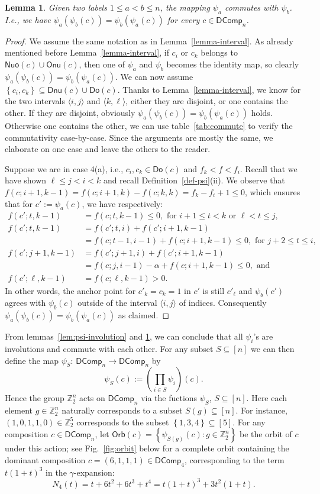 \documentclass[reqno]{amsart}
\numberwithin{equation}{section}
\newtheorem{lemma}[theorem]{Lemma}
\theoremstyle{definition}
\theoremstyle{named}
\newcommand{\set}[1]{\left\{#1\right\}}
\newcommand{\bZ}{\mathbb{Z}}
\def\DComp{\mathsf{DComp}}
\def\Nuo{\mathsf{Nuo}}
\def\Onu{\mathsf{Onu}}
\def\Dnu{\mathsf{Dnu}}
\def\Do{\mathsf{Do}}
\def\uf{\underline{f}}
\def\Orb{\mathsf{Orb}}
\begin{document}
\begin{lemma}\label{lem:commute}
Given two labels $1\le a<b\le n$, the mapping $\psi_a$ commutes with $\psi_b$. I.e., we have $\psi_a(\psi_b(c))=\psi_b(\psi_a(c))$ for every $c\in\DComp_n$.
\end{lemma}
\begin{proof}
We assume the same notation as in Lemma~\ref{lemma-interval}. As already mentioned before Lemma~\ref{lemma-interval}, if $c_i$ or $c_k$ belongs to $\Nuo(c)\cup\Onu(c)$, then one of $\psi_a$ and $\psi_b$ becomes the identity map, so clearly $\psi_a(\psi_b(c))=\psi_b(\psi_a(c))$. We can now assume $\set{c_i,c_k}\subseteq\Dnu(c)\cup\Do(c)$. Thanks to Lemma~\ref{lemma-interval}, we know for the two intervals $\langle i,j\rangle$ and $\langle k,\ell\rangle$, either they are disjoint, or one contains the other. If they are disjoint, obviously $\psi_a(\psi_b(c))=\psi_b(\psi_a(c))$ holds. Otherwise one contains the other, we can use table~\ref{tab:commute} to verify the commutativity case-by-case. Since the arguments are mostly the same, we elaborate on one case and leave the others to the reader. 

Suppose we are in case 4(a), i.e., $c_i,c_k\in\Do(c)$ and $f_k<\uf<f_i$. Recall that we have shown $\ell\le j<i<k$ and recall Definition~\ref{def-psi}(ii). We observe that $f(c;i+1,k-1)=f(c;i+1,k)-f(c;k,k)=f_k-f_i+1\le 0$, which ensures that for $c':=\psi_a(c)$, we have respectively: 
\begin{align*}
f(c';t,k-1) &=f(c;t,k-1)\le 0,\text{ for $i+1\le t<k$ or $\ell<t\le j$,}\\
f(c';t,k-1) &=f(c';t,i)+f(c';i+1,k-1)\\
&=f(c;t-1,i-1)+f(c;i+1,k-1)\le 0, \text{ for $j+2\le t\le i$,}\\
f(c';j+1,k-1) &=f(c';j+1,i)+f(c';i+1,k-1)\\
&=f(c;j,i-1)-\alpha+f(c;i+1,k-1)\le 0, \text{ and}\\
f(c';\ell,k-1) &= f(c;\ell,k-1)>0.
\end{align*}
In other words, the anchor point for $c'_k=c_k=1$ in $c'$ is still $c'_{\ell}$ and $\psi_b(c')$ agrees with $\psi_b(c)$ outside of the interval $\langle i,j\rangle$ of indices. Consequently $\psi_a(\psi_b(c))=\psi_b(\psi_a(c))$ as claimed.
\end{proof}
                        
From lemmas~\ref{lem:psi-involution} and \ref{lem:commute}, we can conclude that all $\psi_i$'s are involutions and commute with each other. For any subset $S\subseteq [n]$ we can then define the map $\psi_S$: $\DComp_n \to \DComp_n$ by
$$ \psi_S(c):=\left(\prod_{i\in S}\psi_i\right)(c).$$
Hence the group $\bZ_2^n$ acts on $\DComp_n$ via the fuctions $\psi_S$, $S\subseteq [n]$. Here each element $g\in \bZ_2^n$ naturally corresponds to a subset $S(g)\subseteq [n]$. For instance, $(1,0,1,1,0)\in\bZ_2^5$ corresponds to the subset $\set{1,3,4}\subseteq [5]$. For any composition $c \in \DComp_n$, let $\Orb(c)=\set{\psi_{S(g)}(c): g \in \bZ_2^n} $ be the orbit of $c$ under this action; see Fig.~\ref{fig:orbit} below for a complete orbit containing the dominant composition $c=(6,1,1,1)\in\DComp_4$, corresponding to the term $t(1+t)^3$ in the $\gamma$-expansion:
$$N_4(t)=t+6t^2+6t^3+t^4=t(1+t)^3+3t^2(1+t).$$
\end{document}
